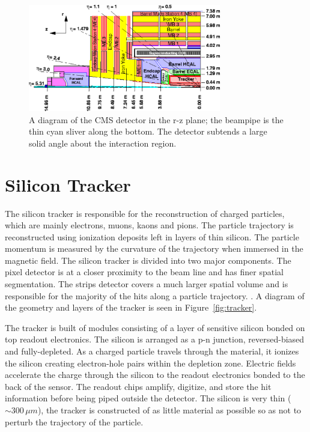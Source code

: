 \begin{figure}[hbp!]
\centering
\includegraphics[width=0.75\textwidth]{figs/img41.pdf}
\caption[A diagram of the CMS detector in the r-z plane.]{A diagram of the CMS detector in the r-z plane; the beampipe is the thin cyan sliver along the bottom. The detector subtends a large solid angle about the interaction region.}
\label{fig:detectoreta}
\end{figure}

\section{Silicon Tracker}

The silicon tracker is responsible for the reconstruction of charged particles, which are mainly electrons, muons, kaons and pions. The particle trajectory is reconstructed using ionization deposits left in layers of thin silicon. The particle momentum is measured by the curvature of the trajectory when immersed in the magnetic field. The silicon tracker is divided into two major components. The pixel detector is at a closer proximity to the beam line and has finer spatial segmentation. The strips detector covers a much larger spatial volume and is responsible for the majority of the hits along a particle trajectory. \cite{trackertdr, trackertdradd}. A diagram of the geometry and layers of the tracker is seen in Figure~\ref{fig:tracker}.

The tracker is built of modules consisting of a layer of sensitive silicon bonded on top readout electronics. The silicon is arranged as a p-n junction, reversed-biased and fully-depleted. As a charged particle travels through the material, it ionizes the silicon creating electron-hole pairs within the depletion zone. Electric fields accelerate the charge through the silicon to the readout electronics bonded to the back of the sensor. The readout chips amplify, digitize, and store the hit information before being piped outside the detector. The silicon is very thin ($\sim300\,\mu m$), the tracker is constructed of as little material as possible so as not to perturb the trajectory of the particle.

